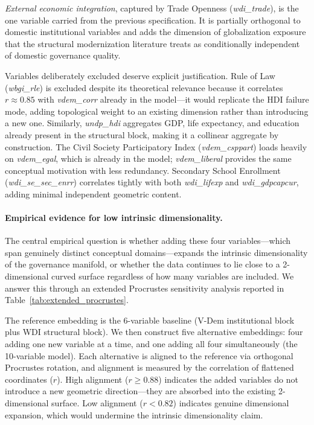 \documentclass[12pt]{article}
\begin{document}
\textit{External economic integration}, captured by Trade Openness (\textit{wdi\_trade}), is the one variable carried from the previous specification. It is partially orthogonal to domestic institutional variables and adds the dimension of globalization exposure that the structural modernization literature treats as conditionally independent of domestic governance quality.

Variables deliberately excluded deserve explicit justification. Rule of Law (\textit{wbgi\_rle}) is excluded despite its theoretical relevance because it correlates $r \approx 0.85$ with \textit{vdem\_corr} already in the model---it would replicate the HDI failure mode, adding topological weight to an existing dimension rather than introducing a new one. Similarly, \textit{undp\_hdi} aggregates GDP, life expectancy, and education already present in the structural block, making it a collinear aggregate by construction. The Civil Society Participatory Index (\textit{vdem\_csppart}) loads heavily on \textit{vdem\_egal}, which is already in the model; \textit{vdem\_liberal} provides the same conceptual motivation with less redundancy. Secondary School Enrollment (\textit{wdi\_se\_sec\_enrr}) correlates tightly with both \textit{wdi\_lifexp} and \textit{wdi\_gdpcapcur}, adding minimal independent geometric content.

\paragraph{Empirical evidence for low intrinsic dimensionality.} The central empirical question is whether adding these four variables---which span genuinely distinct conceptual domains---expands the intrinsic dimensionality of the governance manifold, or whether the data continues to lie close to a 2-dimensional curved surface regardless of how many variables are included. We answer this through an extended Procrustes sensitivity analysis reported in Table~\ref{tab:extended_procrustes}.

The reference embedding is the 6-variable baseline (V-Dem institutional block plus WDI structural block). We then construct five alternative embeddings: four adding one new variable at a time, and one adding all four simultaneously (the 10-variable model). Each alternative is aligned to the reference via orthogonal Procrustes rotation, and alignment is measured by the correlation of flattened coordinates ($r$). High alignment ($r \geq 0.88$) indicates the added variables do not introduce a new geometric direction---they are absorbed into the existing 2-dimensional surface. Low alignment ($r < 0.82$) indicates genuine dimensional expansion, which would undermine the intrinsic dimensionality claim.
\end{document}
